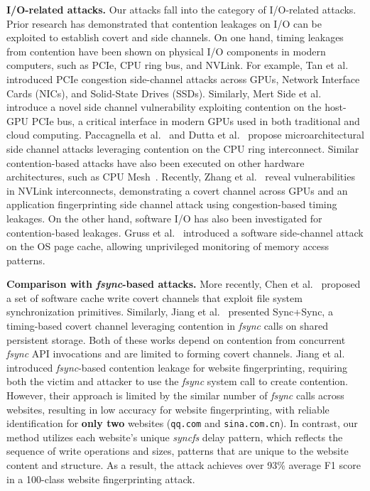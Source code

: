 \textbf{I/O-related attacks.}  Our attacks fall into the category of I/O-related attacks. Prior research has demonstrated that contention leakages on I/O can be exploited to establish covert and side channels. On one hand, timing leakages from contention have been shown on physical I/O components in modern computers, such as PCIe, CPU ring bus, and NVLink. For example, Tan et al.~\cite{tan2021invisible} introduced PCIe congestion side-channel attacks across GPUs, Network Interface Cards (NICs), and Solid-State Drives (SSDs). Similarly, Mert Side et al.~\cite{side2022lockeddown} introduce a novel side channel vulnerability exploiting contention on the host-GPU PCIe bus, a critical interface in modern GPUs used in both traditional and cloud computing.  Paccagnella et al.~\cite{paccagnella2021lord} and Dutta et al.~\cite{dutta2021} propose microarchitectural side channel attacks leveraging contention on the CPU ring interconnect. Similar contention-based attacks have also been executed on other hardware architectures, such as CPU Mesh~\cite{wan2022meshup}. 
Recently, Zhang et al.~\cite{zhang2024beyond} reveal vulnerabilities in NVLink interconnects, demonstrating a covert channel across GPUs and an application fingerprinting side channel attack using congestion-based timing leakages. 
On the other hand, software I/O has also been investigated for contention-based leakages. Gruss et al.~\cite{gruss2019page} introduced a software side-channel attack on the OS page cache, allowing unprivileged monitoring of memory access patterns. 

\textbf{Comparison with \textit{fsync}-based attacks.}
More recently, Chen et al.{~\cite{chen2023sync+}} proposed a set of software cache write covert channels that exploit file system synchronization primitives. Similarly, Jiang et al.{~\cite{jiang2024sync+}} presented Sync+Sync, a timing-based covert channel leveraging contention in \textit{fsync} calls on shared persistent storage. Both of these works depend on contention from concurrent \textit{fsync} API invocations and are limited to forming covert channels. 
Jiang et al.{~\cite{jiang2024sync+}} introduced \textit{fsync}-based contention leakage for website fingerprinting, requiring both the victim and attacker to use the \textit{fsync} system call to create contention. However, their approach is limited by the similar number of \textit{fsync} calls across websites, resulting in low accuracy for website fingerprinting, with reliable identification for \textbf{only two} websites (\texttt{qq.com} and \texttt{sina.com.cn}). 
In contrast, our method utilizes each website's unique \textit{syncfs} delay pattern, which reflects the sequence of write operations and sizes, patterns that are unique to the website content and structure.  As a result, the attack achieves over 93\% average F1 score in a 100-class website fingerprinting attack.


